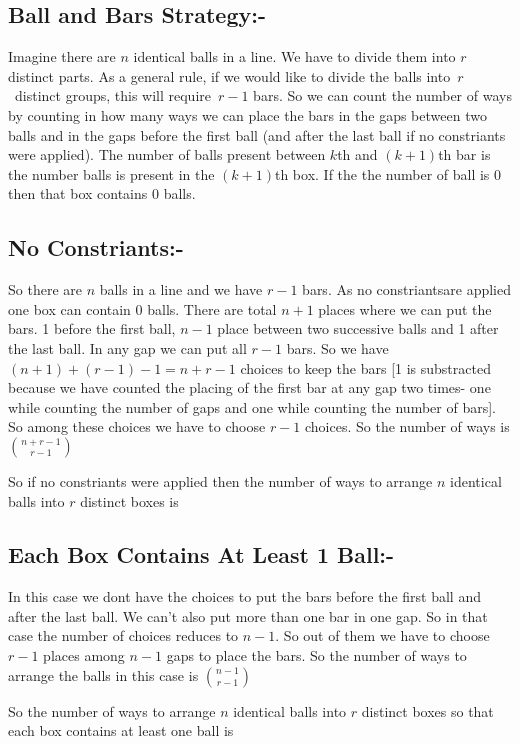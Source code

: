 \documentclass[12pt]{article}
\begin{document}
\subsection{Ball and Bars Strategy:-}
Imagine there are $n $ identical balls in a line. We have to divide them into $r $ distinct parts. As a general rule, if we would like to divide the balls into $r$ distinct groups, this will require $r-1$ bars. So we can count the number of ways by counting in how many ways we can place the bars in the gaps between two balls and in the gaps before the first ball (and after the last ball if no constriants were applied). The number of balls present between $k $th and $(k+1) $th bar is the number balls is present in the $(k+1) $th box. If the the number of ball is 0 then that box contains 0 balls.
\subsection{No Constriants:-}
So there are $n$ balls in a line and we have $r-1$ bars. As no constriantsare applied one box can contain 0 balls. There are total $n+1$ places where we can put the bars. 1 before the first ball, $n-1$ place between two successive balls and 1 after the last ball. In any gap we can put all $r-1$ bars. So we have $(n+1)+(r-1)-1=n+r-1$ choices to keep the bars [1 is substracted because we have counted the placing of the first bar at any gap two times- one while counting the number of gaps and one while counting the number of bars]. So among these choices we have to choose $r-1$ choices. So the number of ways is ${{n+r-1}\choose {r-1}}$

So if no constriants were applied then the number of ways to arrange $n $ identical balls into $r $ distinct boxes is 
\subsection{Each Box Contains At Least 1 Ball:-}
In this case we dont have the choices to put the bars before the first ball and after the last ball. We can't also put more than one bar in one gap. So in that case the number of choices reduces to $n-1$. So out of them we have to choose $r-1 $ places among $n-1$ gaps to place the bars. So the number of ways to arrange the balls in this case is ${{n-1}\choose {r-1}}$

So the number of ways to arrange $n $ identical balls into $r $ distinct boxes so that each box contains at least one ball is 
\end{document}
